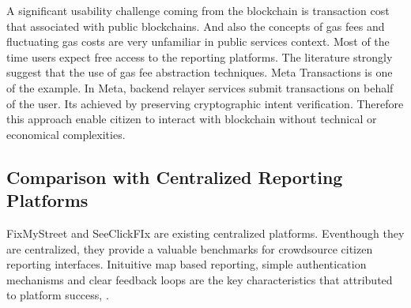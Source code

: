 A significant usability challenge coming from the blockchain is transaction cost that associated with public blockchains. And also the concepts of gas fees and fluctuating gas costs are very unfamiliar in public services context. Most of the time users expect free access to the reporting platforms\cite{mdpi2025usercentric}. The literature strongly suggest that the use of gas fee abstraction techniques. Meta Transactions is one of the example. In Meta, backend relayer services submit transactions on behalf of the user. Its achieved by preserving cryptographic intent verification\cite{sonule2025uxweb3}. Therefore this approach enable citizen to interact with blockchain without technical or economical complexities.


\subsection{Comparison with Centralized Reporting Platforms}




FixMyStreet and SeeClickFIx are existing centralized platforms. Eventhough they are centralized, they provide a valuable benchmarks for crowdsource citizen reporting interfaces. Inituitive map based reporting, simple authentication mechanisms and clear feedback loops are the key characteristics that attributed to platform success\cite{king2012fixmystreet}, \cite{mysociety2026fixmystreet}.

